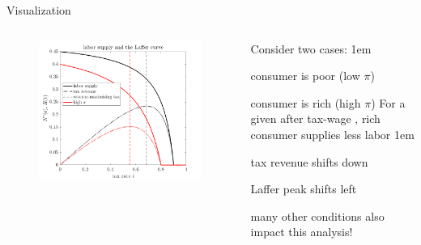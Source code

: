 \documentclass[11pt,aspectratio=43]{beamer}
\let\olditemize=\itemize
\let\endolditemize=\enditemize
\renewenvironment{itemize}{\olditemize \itemsep1em}{\endolditemize}
\let\oldenumerate=\enumerate
\let\endoldenumerate=\endenumerate
\renewenvironment{enumerate}{\oldenumerate \itemsep1em}{ \endoldenumerate}
\theoremstyle{definition}
\begin{document}
\begin{frame}{Visualization}
\label{slide:Visualization}
    \begin{columns}
        \begin{column}{0.5\textwidth}
            \begin{figure}
                \includegraphics[width=\textwidth]{./figures/lafferCurve.png}
            \end{figure}


        \end{column}
        \begin{column}{0.5\textwidth}
            Consider two cases:
            \begin{enumerate}
                \item consumer is poor (low $ \pi $)
                \item consumer is rich (high $ \pi $)
            \end{enumerate}
            For a given after tax-wage , rich consumer supplies less labor
            \begin{itemize}
                \item tax revenue shifts down
                \item Laffer peak shifts left
                \item many other conditions also impact this analysis!
            \end{itemize}
        \end{column}
    \end{columns}
\end{frame}
\end{document}
